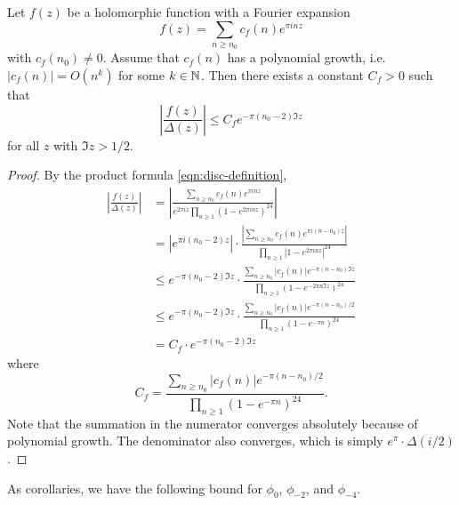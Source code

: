 \begin{lemma}\label{lemma:mod-div-disc-bound}\leanok
Let $f(z)$ be a holomorphic function with a Fourier expansion
\begin{equation}
    f(z) = \sum_{n \ge n_0} c_f(n) e^{\pi i n z}
\end{equation}
with $c_f(n_0) \ne 0$.
Assume that $c_f(n)$ has a polynomial growth, i.e. $|c_f(n)| = O(n^k)$ for some $k \in \mathbb{N}$.
Then there exists a constant $C_f > 0$ such that
\begin{equation}
    \left|\frac{f(z)}{\Delta(z)}\right| \le C_f e^{-\pi (n_0 - 2) \Im z}
\end{equation}
for all $z$ with $\Im z > 1/2$.
\end{lemma}


\begin{proof}\leanok
By the product formula \eqref{eqn:disc-definition},
\begin{align}
    \left|\frac{f(z)}{\Delta(z)}\right| &= \left|\frac{\sum_{n \ge n_0} c_f(n) e^{\pi i n z}}{e^{2 \pi i z}\prod_{n \ge 1} (1 - e^{2\pi i n z})^{24}}\right| \\
    &= |e^{\pi i (n_0 - 2)z}| \cdot \frac{|\sum_{n \ge n_0} c_f(n) e^{\pi i (n - n_0) z}|}{\prod_{n \ge 1} |1 - e^{2\pi i n z}|^{24}} \\
    &\le e^{-\pi (n_0 - 2) \Im z} \cdot \frac{\sum_{n \ge n_0} |c_f(n)| e^{-\pi (n - n_0) \Im z}}{\prod_{n \ge 1} (1 - e^{- 2\pi n \Im z})^{24}} \\
    &\le e^{-\pi (n_0 - 2) \Im z} \cdot \frac{\sum_{n \ge n_0} |c_f(n)| e^{-\pi (n - n_0) / 2}}{\prod_{n \ge 1} (1 - e^{-\pi n})^{24}} \\
    &= C_f \cdot e^{-\pi (n_0 - 2) \Im z}
\end{align}
where
\begin{equation}
    C_f = \frac{\sum_{n \ge n_0} |c_f(n)| e^{-\pi (n - n_0) / 2}}{\prod_{n \ge 1} (1 - e^{-\pi n})^{24}}.
\end{equation}
Note that the summation in the numerator converges absolutely because of polynomial growth.
The denominator also converges, which is simply $e^{\pi} \cdot \Delta(i/2)$.
\end{proof}

As corollaries, we have the following bound for $\phi_0$, $\phi_{-2}$, and $\phi_{-4}$.

